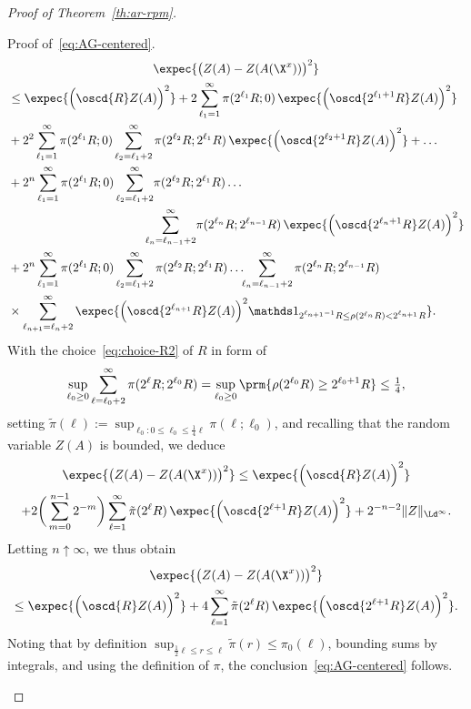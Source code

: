 \begin{proof}[Proof of Theorem~\ref{th:ar-rpm}]
\begin{step}{Proof of~\eqref{eq:AG-centered}.}
\begin{multline*}
\expec{\big(Z(A)-Z(A(\X^x))\big)^2}\\
\begin{aligned}
&\le\expec{\Big(\oscd{R}Z(A)\Big)^2}+2\sum_{\ell_1=1}^\infty\pi(2^{\ell_1} R;0)\,\expec{\Big(\oscd{2^{\ell_1+1}R}Z(A)\Big)^2}\\
&+2^2\sum_{\ell_1=1}^\infty\pi(2^{\ell_1} R;0)\sum_{\ell_2=\ell_1+2}^\infty\pi(2^{\ell_2}R;2^{\ell_1}R)\,\expec{\Big(\oscd{2^{\ell_2+1}R}Z(A)\Big)^2}+\ldots\\
&+2^n\sum_{\ell_1=1}^\infty\pi(2^{\ell_1} R;0)\sum_{\ell_2=\ell_1+2}^\infty\!\pi(2^{\ell_2}R;2^{\ell_1}R)\ldots\\
&\mkern 200mu \sum_{\ell_n=\ell_{n-1}+2}^\infty\!\pi(2^{\ell_n}R;2^{\ell_{n-1}}R)\,\expec{\Big(\oscd{2^{\ell_n+1}R}Z(A)\Big)^2}\\
&+2^n\sum_{\ell_1=1}^\infty\pi(2^{\ell_1} R;0)\sum_{\ell_2=\ell_1+2}^\infty\pi(2^{\ell_2}R;2^{\ell_1}R)\ldots\!\!\sum_{\ell_n=\ell_{n-1}+2}^\infty\pi(2^{\ell_n}R;2^{\ell_{n-1}}R)\\
&\times\sum_{\ell_{n+1}=\ell_n+2}^\infty\expec{\Big(\oscd{2^{\ell_{n+1}}R}Z(A)\Big)^2\mathds1_{2^{\ell_{n+1}-1}R\le\rho(2^{\ell_n}R)<2^{\ell_{n+1}} R}}.
\end{aligned}
\end{multline*}
With the choice~\eqref{eq:choice-R2} of $R$ in form of
\begin{align*}
\sup_{\ell_0\ge0}\sum_{\ell=\ell_0+2}^\infty\pi(2^\ell R;2^{\ell_0}R)=\sup_{\ell_0\ge0}\prm{\rho(2^{\ell_0}R)\ge2^{\ell_0+1}R}\le\tfrac14,
\end{align*}
setting $\tilde\pi(\ell):=\sup_{\ell_0:0\le\ell_0\le\frac14\ell}\pi(\ell;\ell_0)$, and recalling that the random variable $Z(A)$ is bounded, we deduce
\begin{multline*}
\expec{\big(Z(A)-Z(A(\X^x))\big)^2}\le\expec{\Big(\oscd{R}Z(A)\Big)^2}\\
+2\bigg(\sum_{m=0}^{n-1}2^{-m}\bigg)\sum_{\ell=1}^\infty\tilde\pi(2^{\ell} R)\,\expec{\Big(\oscd{2^{\ell+1}R}Z(A)\Big)^2}+2^{-n-2}\|Z\|_{\Ld^\infty}.
\end{multline*}
Letting $n\uparrow\infty$, we thus obtain
\begin{multline*}
\expec{\big(Z(A)-Z(A(\X^x))\big)^2}\\
\le\expec{\Big(\oscd{R}Z(A)\Big)^2}+4\sum_{\ell=1}^\infty\tilde\pi(2^{\ell} R)\,\expec{\Big(\oscd{2^{\ell+1}R}Z(A)\Big)^2}.
\end{multline*}
Noting that by definition $\sup_{\frac12\ell\le r\le\ell}\tilde\pi(r)\le \pi_0(\ell)$, bounding sums by integrals, and using the definition of $\pi$, the conclusion~\eqref{eq:AG-centered} follows.
\end{step}
\end{proof}



